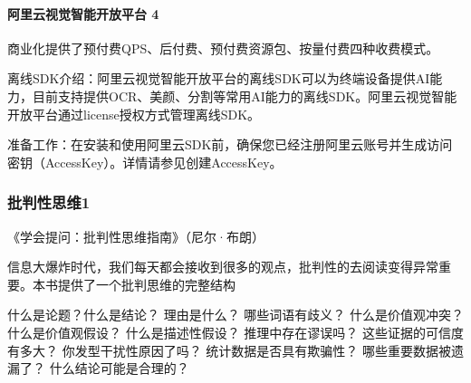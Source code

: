 \documentclass[letterpaper,11pt,english]{sphinxmanual}
\begin{document}
\paragraph{阿里云视觉智能开放平台 4\sphinxfootnotemark[351]}
\label{\detokenize{chapter_idea/business:id28}}%
\begin{footnotetext}[349]\sphinxAtStartFootnote
{}
%
\end{footnotetext}\ignorespaces %
\begin{footnotetext}[350]\sphinxAtStartFootnote
{}
%
\end{footnotetext}\ignorespaces %
\begin{footnotetext}[351]\sphinxAtStartFootnote
{}
%
\end{footnotetext}\ignorespaces 
商业化提供了预付费QPS、后付费、预付费资源包、按量付费四种收费模式。

离线SDK介绍：阿里云视觉智能开放平台的离线SDK可以为终端设备提供AI能力，目前支持提供OCR、美颜、分割等常用AI能力的离线SDK。阿里云视觉智能开放平台通过license授权方式管理离线SDK。

准备工作：在安装和使用阿里云SDK前，确保您已经注册阿里云账号并生成访问密钥（AccessKey）。详情请参见创建AccessKey。


\subsubsection{批判性思维1\sphinxfootnotemark[352]}
\label{\detokenize{chapter_idea/critical:id1}}\label{\detokenize{chapter_idea/critical::doc}}%
\begin{footnotetext}[352]\sphinxAtStartFootnote
{}
%
\end{footnotetext}\ignorespaces 
《学会提问：批判性思维指南》（尼尔·布朗）

信息大爆炸时代，我们每天都会接收到很多的观点，批判性的去阅读变得异常重要。本书提供了一个批判思维的完整结构

什么是论题？什么是结论？ 理由是什么？ 哪些词语有歧义？
什么是价值观冲突？什么是价值观假设？ 什么是描述性假设？
推理中存在谬误吗？ 这些证据的可信度有多大？ 你发型干扰性原因了吗？
统计数据是否具有欺骗性？ 哪些重要数据被遗漏了？ 什么结论可能是合理的？
\end{document}
